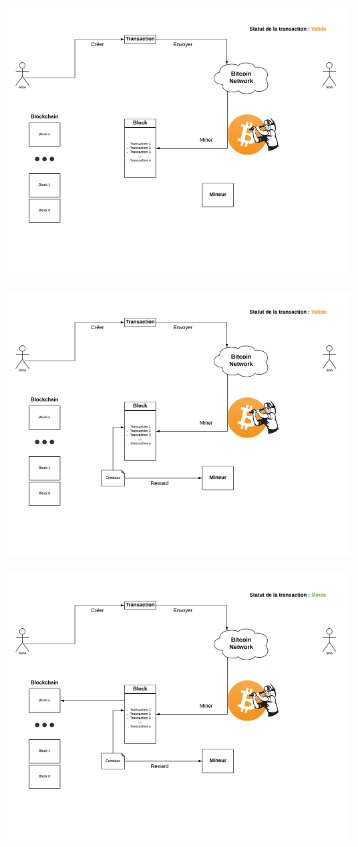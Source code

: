 \documentclass{beamer}
\begin{document}
\begin{frame}
    \begin{center}
        \includegraphics[height=7cm]{images/explanation-3.png}
    \end{center}
\end{frame}

\begin{frame}
    \begin{center}
        \includegraphics[height=7cm]{images/explanation-4.png}
    \end{center}
\end{frame}

\begin{frame}
    \begin{center}
        \includegraphics[height=7cm]{images/explanation-5.png}
    \end{center}
\end{frame}
\end{document}
